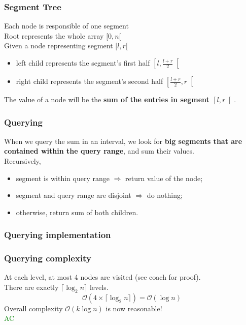 \documentclass[12pt]{beamer}
\newcommand{\bigoh}{\mathcal{O}}
\begin{document}
\begin{frame}
    \frametitle{Segment Tree}
    Each node is responsible of one segment \\
    Root represents the whole array $[0, n[$ \\
    Given a node representing segment $[l, r[$ 
    \begin{itemize}
        \item left child represents the segment's first half $\left[ l, \frac{l+r}{2} \right[$
        \item right child represents the segment's second half $\left[ \frac{l+r}{2}, r \right[$
    \end{itemize}
    The value of a node will be the \textbf{sum of the entries in segment $\left[ l, r \right[$}.

\end{frame}

\begin{frame}
    \frametitle{Querying}
    When we query the sum in an interval, we look for \textbf{big segments that are contained within the query range}, and sum their values. \\
    Recursively,
    \begin{itemize}
        \item segment is within query range $\Rightarrow$ return value of the node;
        \item segment and query range are disjoint $\Rightarrow$ do nothing;
        \item otherwise, return sum of both children.
    \end{itemize}
\end{frame}

\begin{frame}
    \frametitle{Querying implementation}

    
\end{frame}

\begin{frame}
    \frametitle{Querying complexity}

    At each level, at most 4 nodes are visited (see coach for proof). \\
    There are exactly $\lceil \log_2 n \rceil$ levels.
    \[
        \bigoh(4\times \lceil \log_2 n \rceil) = \bigoh(\log n)
    \]
    Overall complexity $\bigoh(k \log n)$ is now reasonable! \\
    \textcolor{green}{AC}
\end{frame}
\end{document}
